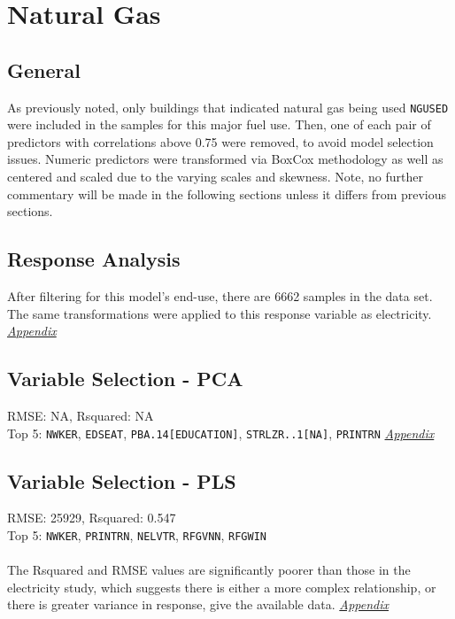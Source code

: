 \section*{Natural Gas}
\label{sec:natural_gas}

\subsection{General}
As previously noted, only buildings that indicated natural gas being used \lstinline{NGUSED} were included in the samples for this major fuel use.  Then, one of each pair of predictors with correlations above 0.75 were removed, to avoid model selection issues. Numeric predictors were transformed via BoxCox methodology as well as centered and scaled due to the varying scales and skewness.  Note, no further commentary will be made in the following sections unless it differs from previous sections.

\subsection{Response Analysis}

After filtering for this model's end-use, there are 6662 samples in the data set.  The same transformations were applied to this response variable as electricity. \textit{\hyperref[appendix:natural_gas:response]{Appendix}}

\subsection{Variable Selection - PCA}
RMSE: NA, Rsquared: NA\\
Top 5: \lstinline{NWKER}, \lstinline{EDSEAT}, \lstinline{PBA.14[EDUCATION]}, \lstinline{STRLZR..1[NA]}, \lstinline{PRINTRN}  \textit{\hyperref[appendix:natural_gas:pca]{Appendix}}

\subsection{Variable Selection - PLS}
RMSE: 25929, Rsquared: 0.547\\
Top 5: \lstinline{NWKER}, \lstinline{PRINTRN}, \lstinline{NELVTR}, \lstinline{RFGVNN}, \lstinline{RFGWIN}\\
\\[0.1in]
The Rsquared and RMSE values are significantly poorer than those in the electricity study, which suggests there is either a more complex relationship, or there is greater variance in response, give the available data.  \textit{\hyperref[appendix:natural_gas:pls]{Appendix}}


